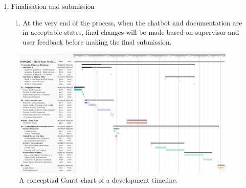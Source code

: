 \documentclass[12pt]{report}
\begin{document}
\begin{enumerate}
        \item Finalisation and submission
        \begin{enumerate}
            \item At the very end of the process, when the chatbot and documentation are in acceptable states,
            final changes will be made based on supervisor and user feedback before making the final submission.
        \end{enumerate}
    \end{enumerate}

    \pagebreak

    \begin{landscape}

    \begin{figure}[H]
        \centering
        \includegraphics[width=.9\linewidth]{ProposalGantt.png}
        \caption{A conceptual Gantt chart of a development timeline.}
        \label{fig:gantt}
    \end{figure}

    \end{landscape}
\end{document}
